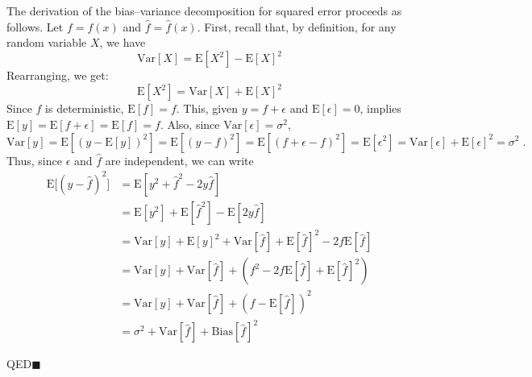 \documentclass[sfsidenotes,notoc,nobib,a4paper]{tufte-book}
\begin{document}
The derivation of the bias–variance decomposition for squared error proceeds as follows. Let $f=f(x)$ and $\hat{f}=\hat {f}(x)$. First, recall that, by definition, for any random variable $X$, we have
\begin{equation*}
\mathrm{Var}[X] = \mathrm{E}[X^2] - \mathrm{E}[X]^2
\end{equation*}
Rearranging, we get:
\begin{equation*}
\mathrm{E}[X^2] = \mathrm{Var}[X] + \mathrm{E}[X]^2	
\end{equation*}
Since $f$ is deterministic, $\mathrm{E}[f] = f$. This, given $y=f+\epsilon$  and $\mathrm{E}[\epsilon ]=0$, implies $\mathrm  {E}[y]={\mathrm  {E}}[f+\epsilon ]={\mathrm  {E}}[f]=f$.
Also, since $\mathrm{Var}[\epsilon ]=\sigma ^{2}$,
\begin{equation*}
	\mathrm {Var} [y]=\mathrm {E} [(y-\mathrm {E} [y])^{2}]=\mathrm {E} [(y-f)^{2}]=\mathrm {E} [(f+\epsilon -f)^{2}]=\mathrm {E} [\epsilon ^{2}]=\mathrm {Var} [\epsilon ]+\mathrm {E} [\epsilon ]^{2}=\sigma ^{2}\;.
\end{equation*}
Thus, since $\epsilon$  and $\hat {f}$ are independent, we can write
\begin{align*}
	\mathrm {E} {\big [}(y-{\hat {f}})^{2}{\big ]}&=\mathrm {E} [y^{2}+{\hat {f}}^{2}-2y{\hat {f}}]\\&=\mathrm {E} [y^{2}]+\mathrm {E} [{\hat {f}}^{2}]-\mathrm {E} [2y{\hat {f}}]\\&=\mathrm {Var} [y]+\mathrm {E} [y]^{2}+\mathrm {Var} [{\hat {f}}]+\mathrm {E} [{\hat {f}}]^{2}-2f\mathrm {E} [{\hat {f}}]\\&=\mathrm {Var} [y]+\mathrm {Var} [{\hat {f}}]+(f^{2}-2f\mathrm {E} [{\hat {f}}]+\mathrm {E} [{\hat {f}}]^{2})\\&=\mathrm {Var} [y]+\mathrm {Var} [{\hat {f}}]+(f-\mathrm {E} [{\hat {f}}])^{2}\\&=\sigma ^{2}+\mathrm {Var} [{\hat {f}}]+\mathrm {Bias} [{\hat {f}}]^{2}
\end{align*}

QED$\blacksquare$







\appendix




\printbibliography[heading=bibintoc]
\printindex
\end{document}
